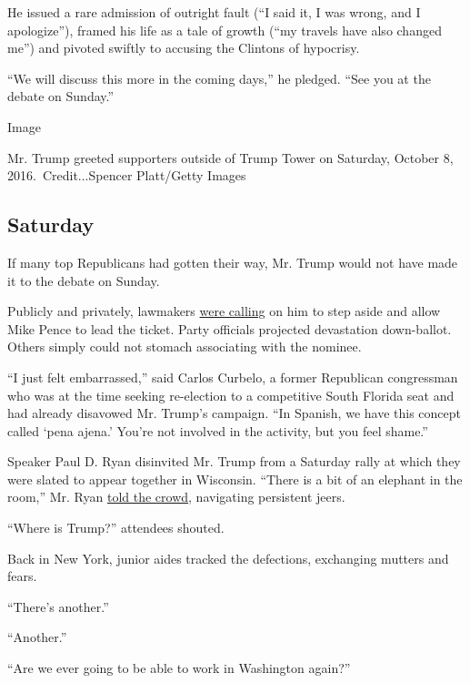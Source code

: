 He issued a rare admission of outright fault (``I said it, I was wrong,
and I apologize''), framed his life as a tale of growth (``my travels
have also changed me'') and pivoted swiftly to accusing the Clintons of
hypocrisy.

``We will discuss this more in the coming days,'' he pledged. ``See you
at the debate on Sunday.''

Image

Mr. Trump greeted supporters outside of Trump Tower on Saturday, October
8, 2016.~Credit...Spencer Platt/Getty Images

\hypertarget{saturday}{%
\subsection{Saturday}\label{saturday}}

If many top Republicans had gotten their way, Mr. Trump would not have
made it to the debate on Sunday.

Publicly and privately, lawmakers
\href{https://www.pbs.org/newshour/politics/headline-republicans-react-trump-comments-objectifying-women}{were
calling} on him to step aside and allow Mike Pence to lead the ticket.
Party officials projected devastation down-ballot. Others simply could
not stomach associating with the nominee.

``I just felt embarrassed,'' said Carlos Curbelo, a former Republican
congressman who was at the time seeking re-election to a competitive
South Florida seat and had already disavowed Mr. Trump's campaign. ``In
Spanish, we have this concept called `pena ajena.' You're not involved
in the activity, but you feel shame.''

Speaker Paul D. Ryan disinvited Mr. Trump from a Saturday rally at which
they were slated to appear together in Wisconsin. ``There is a bit of an
elephant in the room,'' Mr. Ryan
\href{https://madison.com/wsj/news/local/govt-and-politics/paul-ryan-heckled-on-home-turf-after-donald-trump-mike-pence-scratched-from-gop-event/article_8e0acf67-1f2f-56a4-b42d-e8ebcbd0bc67.html}{told
the crowd}, navigating persistent jeers.

``Where is Trump?'' attendees shouted.

Back in New York, junior aides tracked the defections, exchanging
mutters and fears.

``There's another.''

``Another.''

``Are we ever going to be able to work in Washington again?''

